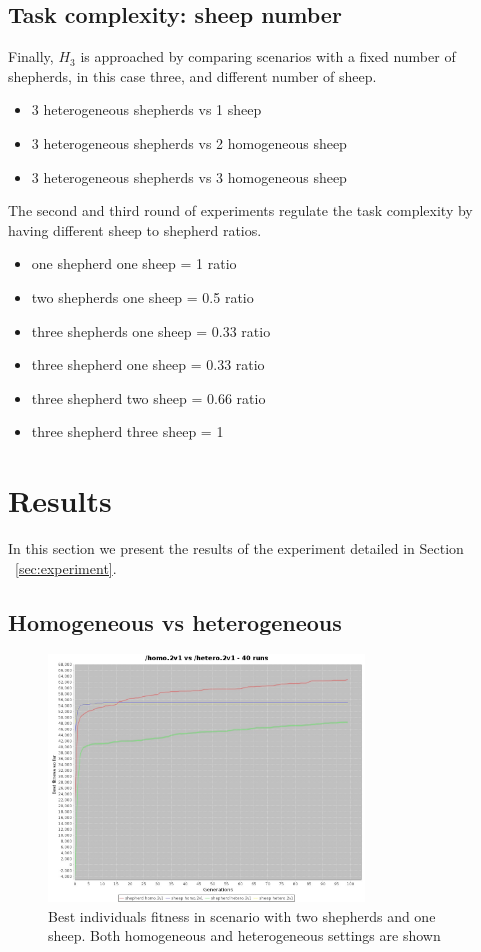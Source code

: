 \documentclass[conference]{IEEEtran}
\begin{document}
\subsection{Task complexity: sheep number}
Finally, $H_3$ is approached by comparing scenarios with a fixed number of shepherds, in this case three, and different number of sheep. 
\begin{itemize}
	\item 3 heterogeneous shepherds vs 1 sheep
	\item 3 heterogeneous shepherds vs 2 homogeneous sheep
	\item 3 heterogeneous shepherds vs 3 homogeneous sheep
\end{itemize}
The second and third round of experiments regulate the task complexity by having different sheep to shepherd ratios. 
\begin{itemize}
	\item one shepherd one sheep = 1 ratio
	\item two shepherds one sheep = 0.5 ratio
	\item three shepherds one sheep = 0.33 ratio
	
	\item three shepherd one sheep = 0.33 ratio
	\item three shepherd two sheep = 0.66 ratio
	\item three shepherd three sheep = 1
\end{itemize}


\section{Results}
In this section we present the results of the experiment detailed in Section ~\ref{sec:experiment}.

\subsection{Homogeneous vs heterogeneous}
\begin{figure}[ht]
	\centering
	\includegraphics[width=3.3in]{imgs/homo2v1-hetero2v1-bestSoFar.jpeg}
	\caption{Best individuals fitness in scenario with two shepherds and one sheep. Both homogeneous and heterogeneous settings are shown}
	\label{fig:2v1_homo_vs_hetero}
\end{figure}
\end{document}
